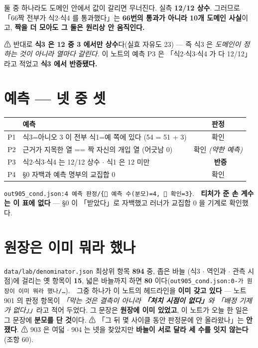 \documentclass{article}
\begin{document}
{둘 중 하나라도 도메인 안에서 값이 갈리면 무너진다. 실측 \textbf{12/12 상수}.
그러므로 「66짝 전부가 식2$\cdot$식4 를 통과했다」는 \textbf{66번의 통과가 아니라
10개 도메인 사실}이고, \textbf{짝을 더 모아도 그 둘은 원리상 안 움직인다.}}

⚠ 반대로 \textbf{식3 은 12 중 3 에서만 상수}다(실효 자유도 23) --- 즉 식3 은
\emph{도메인이 정하는 것이 아니라 열마다 갈린다.} 이 노트의 예측 P3 은
「식2$\cdot$식3$\cdot$식4 가 다 12/12」라고 적었고 \textbf{식3 에서 반증됐다.}

\section{예측 --- 넷 중 셋}

\begin{center}
\begin{tabular}{llc}
\toprule
& 예측 & 판정 \\
\midrule
P1 & 식3=아니오 3 이 전부 식1=예 쪽에 있다 (54 = 51 + 3) & 확인 \\
P2 & 근거가 지목한 열 == 짝 자신의 개입 열 (어긋남 0) & 확인 \emph{(약한 예측)} \\
P3 & 식2$\cdot$식3$\cdot$식4 는 12/12 상수 $\cdot$ 식1 은 12 미만 & \textbf{🔴 반증} \\
P4 & \S 0 자백과 예측 명부의 교집합 0 & 확인 \\
\bottomrule
\end{tabular}
\end{center}

\texttt{out905\_cond.json:4 예측 판정/\{🔴 예측 수(분모)=4, 🔴 확인=3\}}.
🔴 \textbf{티처가 준 손 계수는 이 표에 없다} --- \S 0 이 「받았다」로 자백했고
러너가 교집합 0 을 기계로 확인했다.

\section{원장은 이미 뭐라 했나}

\texttt{data/lab/denominator.json} 최상위 항목 \textbf{894} 중, 좁은 바늘
(식3 $\cdot$ 역인과 $\cdot$ 관측 시점)에 걸리는 옛 항목이 \textbf{15}, 넓은 바늘까지 하면
\textbf{80} 이다(\texttt{out905\_cond.json:0-가 원장이 이미 뭐라 했나/…}).
🔴 그중 하나가 이 노트의 헤드라인을 \textbf{이미 갖고 있다} --- 노트 901 의 판정 항목이
\emph{「막는 것은 결측이 아니라 \textbf{「처치 시점이 없다」}와 「배정 기제가 없다」」}라고
적어 두었다. 그 문장은 \textbf{원장에 이미 있었고}, 이 노트가 오늘 한 일은 그 문장에 \textbf{분모를 단 것}이다. ⚠ 「그 뒤 몇 사이클 동안 판정문에 안 올라왔나」는 \textbf{안 쟀다}.
⚠ 903 은 여덟 $\cdot$ 904 는 넷을 찾았지만 \textbf{바늘이 서로 달라 세 수를 잇지 않는다}(조항 60).
\end{document}
